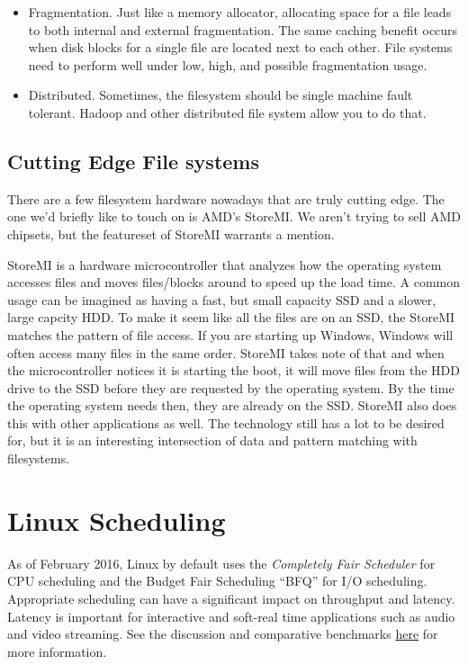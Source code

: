 \begin{itemize}
\item Fragmentation. Just like a memory allocator, allocating space for a file leads to both internal and external fragmentation. The same caching benefit occurs when disk blocks for a single file are located next to each other. File systems need to perform well under low, high, and possible fragmentation usage.
\item Distributed. Sometimes, the filesystem should be single machine fault tolerant. Hadoop and other distributed file system allow you to do that.
\end{itemize}

\subsection{Cutting Edge File systems}

There are a few filesystem hardware nowadays that are truly cutting edge.
The one we'd briefly like to touch on is AMD's StoreMI.
We aren't trying to sell AMD chipsets, but the featureset of StoreMI warrants a mention.

StoreMI is a hardware microcontroller that analyzes how the operating system accesses files and moves files/blocks around to speed up the load time.
A common usage can be imagined as having a fast, but small capacity SSD and a slower, large capcity HDD.
To make it seem like all the files are on an SSD, the StoreMI matches the pattern of file access.
If you are starting up Windows, Windows will often access many files in the same order.
StoreMI takes note of that and when the microcontroller notices it is starting the boot, it will move files from the HDD drive to the SSD before they are requested by the operating system.
By the time the operating system needs then, they are already on the SSD.
StoreMI also does this with other applications as well.
The technology still has a lot to be desired for, but it is an interesting intersection of data and pattern matching with filesystems.


\section{Linux Scheduling}

As of February 2016, Linux by default uses the \emph{Completely Fair Scheduler} for CPU scheduling and the Budget Fair Scheduling ``BFQ'' for I/O scheduling. Appropriate scheduling can have a significant impact on throughput and latency. Latency is important for interactive and soft-real time applications such as audio and video streaming. See the discussion and comparative benchmarks \href{https://lkml.org/lkml/2014/5/27/314}{here} for more information.

